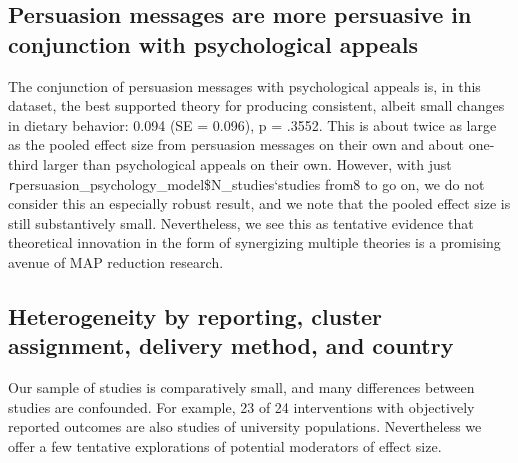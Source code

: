 \documentclass[sn-nature,pdflatex]{sn-jnl}
\begin{document}
\begin{comment}
Another way to consider effect decay is to look at studies which measure
consumption at multiple time points
\citetext{\citealp[e.g.][]{bianchi202022}; \citealp[@bschaden2020, @carfora2023]{bochmann2022}; \citealp{jalil2023}}.
We note that for the most part, effects seem to decline over time;
\citep{jalil2023}, where effects persist for at least three years, is a
prominent counter-example. However, because most of the studies we
looked at featured attrition over time, we do not place too much stock
in this result.

\begin{comment} There is probably a way to do this quantitatively and if we get asked to do it in review, I'll do it, but it's a fair bit of work and I think we've made the general point 
\end{comment}

\subsection{Persuasion messages are more persuasive in conjunction with
psychological appeals}\label{sec2.10}

The conjunction of persuasion messages with psychological appeals is, in
this dataset, the best supported theory for producing consistent, albeit
small changes in dietary behavior: 0.094 (SE = 0.096), p = .3552. This
is about twice as large as the pooled effect size from persuasion
messages on their own and about one-third larger than psychological
appeals on their own. However, with just
\texttt{r}persuasion\_psychology\_model\$N\_studies`studies from8 to go
on, we do not consider this an especially robust result, and we note
that the pooled effect size is still substantively small. Nevertheless,
we see this as tentative evidence that theoretical innovation in the
form of synergizing multiple theories is a promising avenue of MAP
reduction research.

\subsection{Heterogeneity by reporting, cluster assignment, delivery
method, and country}\label{sec2.11}

Our sample of studies is comparatively small, and many differences
between studies are confounded. For example, 23 of 24 interventions with
objectively reported outcomes are also studies of university
populations. Nevertheless we offer a few tentative explorations of
potential moderators of effect size.
\end{document}
